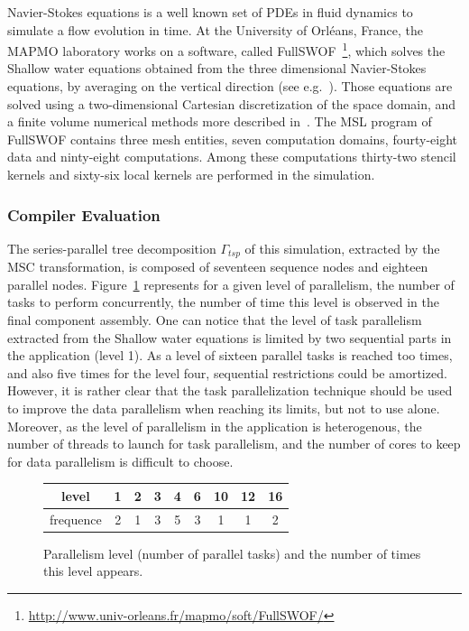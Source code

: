 Navier-Stokes equations is a well known set of PDEs in fluid dynamics to simulate a flow evolution in time. At the University of Orl\'eans, France, the MAPMO laboratory works on a software, called FullSWOF~\footnote{\url{http://www.univ-orleans.fr/mapmo/soft/FullSWOF/}}, which solves the Shallow water equations obtained from the three dimensional Navier-Stokes equations, by averaging on the vertical direction (see e.g.~\cite{Ferrari2004}). Those equations are solved using a two-dimensional Cartesian discretization of the space domain, and a finite volume numerical methods more described in~\cite{CPE:CPE3494}. The MSL program of FullSWOF contains three mesh entities, seven computation domains, fourty-eight data and ninty-eight computations. Among these computations thirty-two stencil kernels and sixty-six local kernels are performed in the simulation.

\subsubsection*{Compiler Evaluation}

The series-parallel tree decomposition $\Gamma_{tsp}$ of this simulation, extracted by the MSC transformation, is composed of seventeen sequence nodes and eighteen parallel nodes. Figure~\ref{fig:freq} represents for a given level of parallelism, \ie the number of tasks to perform concurrently, the number of time this level is observed in the final component assembly. One can notice that the level of task parallelism extracted from the Shallow water equations is limited by two sequential parts in the application (level 1). As a level of sixteen parallel tasks is reached too times, and also five times for the level four, sequential restrictions could be amortized. However, it is rather clear that the task parallelization technique should be used to improve the data parallelism when reaching its limits, but not to use alone. Moreover, as the level of parallelism in the application is heterogenous, the number of threads to launch for task parallelism, and the number of cores to keep for data parallelism is difficult to choose.

\begin{figure}[!h]
 \begin{center}
 \begin{tabular}{|c|c|c|c|c|c|c|c|c|}
    \hline 
   level & 1 & 2 & 3 & 4 & 6 & 10 & 12 & 16\\
   \hline
   frequence & 2 & 1 & 3 & 5 & 3 & 1 & 1 & 2\\
   \hline
 \end{tabular}
\caption{Parallelism level (number of parallel tasks) and the number of times this level appears.}
\label{fig:freq}
 \end{center}
\end{figure}

